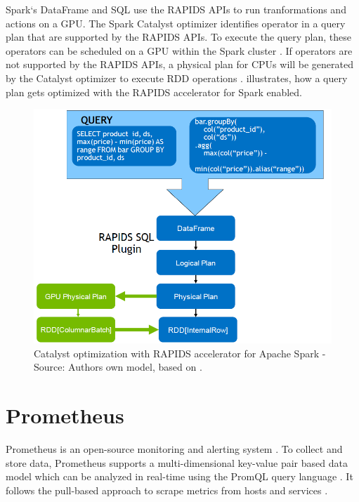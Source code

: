 Spark`s DataFrame and SQL use the RAPIDS APIs to run tranformations and actions on a GPU.
The Spark Catalyst optimizer identifies operator in a query plan that are supported by the RAPIDS APIs. To execute the query plan, these operators can be scheduled on a GPU within the Spark cluster \cite{Mcdonald2020SparkRapids}. If operators are not supported by the RAPIDS APIs, a physical plan for CPUs will be generated by the Catalyst optimizer to execute RDD operations \cite{Mcdonald2020SparkRapids}.  illustrates, how a query plan gets optimized with the RAPIDS accelerator for Spark enabled.

\begin{figure}[h]%
\centering
\includegraphics[scale=0.25]{images/03_background/rapids_query_plan}%
\caption{Catalyst optimization with RAPIDS accelerator for Apache Spark - Source: Authors own model, based on \cite{Mcdonald2020SparkRapids}.}%
\label{fig:rapids_query_plan}%
\end{figure}


\section{Prometheus}
Prometheus is an open-source monitoring and alerting system \cite{Prom2020Docs}.
To collect and store data, Prometheus supports a multi-dimensional key-value pair based data model which can be analyzed in real-time using the PromQL query language \cite{Pandey2020Monitoring}.
It follows the pull-based approach to scrape metrics from hosts and services \cite{Bastos2019Prom}.

